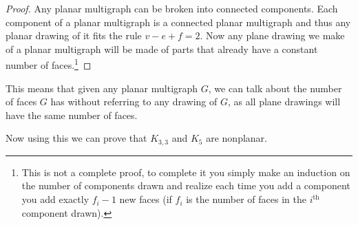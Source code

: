 \documentclass{article}
\begin{document}
\begin{proof}
	Any planar multigraph can be broken into connected components. Each component of a planar multigraph is a connected planar multigraph and thus any planar drawing of it fits the rule $v-e+f=2$.  Now any plane drawing we make of a planar multigraph will be made of parts that already have a constant number of faces.\footnote{This is not a complete proof, to complete it you simply make an induction on the number of components drawn and realize each time you add a component you add exactly $f_{i}-1$ new faces (if $f_i$ is the number of faces in the $i^{\text{th}}$ component drawn).}
	
\end{proof}

This means that given any planar multigraph $G$, we can talk about the number of faces $G$ has without referring to any drawing of $G$, as all plane drawings will have the same number of faces.

Now using this we can prove that $K_{3,3}$ and $K_5$ are nonplanar.
\end{document}
